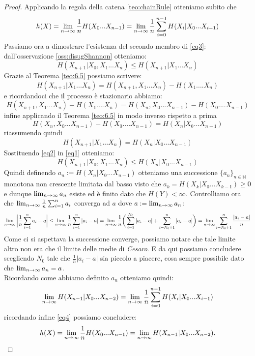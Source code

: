 \begin{proof}
Applicando la regola della catena \ref{teo:chainRule} otteniamo subito che
\begin{equation}\label{eq4}
h(X)=\lim_{n\to \infty} \frac{1}{n} H(X_0...X_{n-1})= \lim_{n\to \infty} \frac{1}{n} \sum_{i=0}^{n-1}H(X_i|X_0...X_{i-1})
\end{equation}
Passiamo ora a dimostrare l'esistenza del secondo membro di \ref{eq3}:\\
dall'osservazione \ref{oss:disugShannon} otteniamo:
\begin{equation} \label{eq1}
H(X_{n+1}|X_0,X_1...X_n) \leq H(X_{n+1}|X_1...X_n)
\end{equation}
Grazie al Teorema \ref{teo:6.5} possiamo scrivere:
$$H(X_{n+1}|X_1...X_n)=H(X_{n+1},X_1...X_n) - H(X_1....X_n)$$
e ricordandoci che il processo è stazionario abbiamo:
$$H(X_{n+1},X_1...X_n) - H(X_1....X_n)= H(X_{n},X_0...X_{n-1}) - H(X_0....X_{n-1})$$
infine applicando il Teorema \ref{teo:6.5} in modo inverso rispetto a prima
$$H(X_{n},X_0...X_{n-1}) - H(X_0....X_{n-1})=H(X_{n}|X_0...X_{n-1})$$
riassumendo quindi
\begin{equation} \label{eq2}
H(X_{n+1}|X_1...X_n)=H(X_{n}|X_0...X_{n-1})
\end{equation}
Sostituendo \ref{eq2} in \ref{eq1} otteniamo:
\begin{equation}
H(X_{n+1}|X_0,X_1...X_n) \leq H(X_{n}|X_0...X_{n-1})
\end{equation}
Quindi definendo $a_n :=  H(X_{n}|X_0...X_{n-1})$ otteniamo una successione $\{ a_n \}_{n\in \mathbb{N}}$ monotona non crescente limitata dal basso visto che $a_k=H(X_{k}|X_0...X_{k-1})\geq 0$ e dunque $\lim_{n\to \infty} a_n$ esiste ed è finito dato che $H(Y)< \infty $.
Controlliamo ora che  $ \lim_{n \to \infty} \frac{1}{n} \sum_{i=1}^n a_i$ converga ad $a$ dove $a:=\lim_{n\to \infty} a_n$:
$$\lim_{n\to \infty} \bigg| \frac{1}{n} \sum_{i=1}^n a_i-a \bigg| \leq \lim_{n\to \infty} \frac{1}{n} \sum_{i=1}^n |a_i-a| = \lim_{n\to \infty} \frac{1}{n} \bigg( \sum_{i=1}^{N_0} |a_i-a| + \sum_{i=N_0+1}^{n} |a_i-a| \bigg) = \lim_{n\to \infty} \sum_{i=N_0+1}^{n} \frac{|a_i-a|}{n}$$
Come ci si aspettava la successione converge, possiamo notare che tale limite altro non era che il limite delle medie di \textit{Cesaro}.
E da qui possiamo concludere scegliendo $N_0$ tale che $\frac{1}{n}|a_i-a|$ sia piccolo a piacere, cosa sempre possibile dato che $\lim_{n\to \infty} a_n=a$.\\
Ricordando come abbiamo definito $a_n$ otteniamo quindi:
\begin{equation}
\lim_{n\to \infty} H(X_{n-1}|X_0...X_{n-2})=\lim_{n\to \infty} \frac{1}{n} \sum_{i=0}^{n-1}H(X_i|X_0...X_{i-1})
\end{equation}
ricordando infine \ref{eq4} possiamo concludere:
$$h(X)=\lim_{n\to \infty} \frac{1}{n} H(X_0...X_{n-1}) = \lim_{n\to \infty} H(X_{n-1}|X_0...X_{n-2}).$$
\end{proof}
